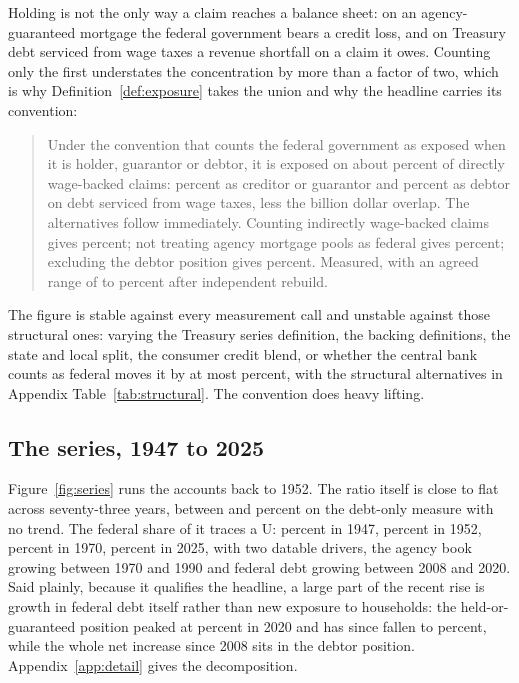 \begin{table}[htbp]
\centering
\caption{Holders of directly wage-backed claims, 2025. Measured.}
\label{tab:holders}

\end{table}

Holding is not the only way a claim reaches a balance sheet: on an agency-guaranteed mortgage the
federal government bears a credit loss, and on Treasury debt serviced from wage taxes a revenue
shortfall on a claim it owes. Counting only the first understates the concentration by more than a
factor of two, which is why Definition~\ref{def:exposure} takes the union and why the headline
carries its convention:

\begin{quote}
Under the convention that counts the federal government as exposed when it is holder, guarantor
or debtor, it is exposed on about  percent of directly wage-backed claims:
 percent as creditor or guarantor and  percent
as debtor on debt serviced from wage taxes, less the  billion dollar overlap.
The alternatives follow immediately. Counting indirectly wage-backed claims gives
 percent; not treating agency mortgage pools as federal gives
 percent; excluding the debtor position gives
 percent. Measured, with an agreed range of
 to  percent after independent rebuild.
\end{quote}

The figure is stable against every measurement call and unstable against those structural ones:
varying the Treasury series definition, the backing definitions, the state and local split, the
consumer credit blend, or whether the central bank counts as federal moves it by at most
 percent, with the structural alternatives in Appendix
Table~\ref{tab:structural}. The convention does heavy lifting.

\subsection{The series, 1947 to 2025}

Figure~\ref{fig:series} runs the accounts back to 1952. The ratio itself is close to flat across seventy-three years, between  and  percent on the debt-only measure with no trend. The federal share of it traces a U:  percent in 1947,  percent in 1952,  percent in 1970,  percent in 2025, with two datable drivers, the agency book growing between 1970 and 1990 and federal debt growing between 2008 and 2020. Said plainly, because it qualifies the headline, a large part of the recent rise is growth in federal debt itself rather than new exposure to households: the held-or-guaranteed position peaked at  percent in 2020 and has since fallen to  percent, while the whole net increase since 2008 sits in the debtor position. Appendix~\ref{app:detail} gives the decomposition.

